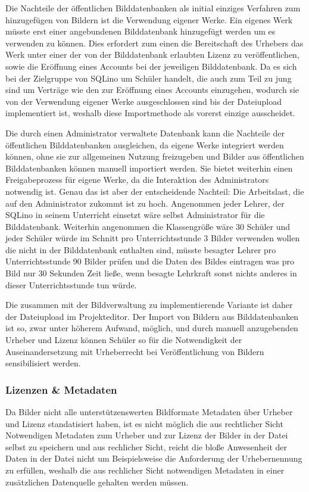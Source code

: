 Die Nachteile der öffentlichen Bilddatenbanken als initial einziges Verfahren
zum hinzugefügen von Bildern ist die Verwendung eigener Werke. Ein eigenes Werk
müsste erst einer angebundenen Bilddatenbank hinzugefügt werden um es verwenden
zu können. Dies erfordert zum einen die Bereitschaft des Urhebers das Werk unter
einer der von der Bilddatenbank erlaubten Lizenz zu veröffentlichen, sowie die
Eröffnung eines Accounts bei der jeweiligen Bilddatenbank. Da es sich bei der
Zielgruppe von SQLino um Schüler handelt, die auch zum Teil zu jung sind um
Verträge wie den zur Eröffnung eines Accounts einzugehen, wodurch sie von der
Verwendung eigener Werke ausgeschlossen sind bis der Dateiupload implementiert
ist, weshalb diese Importmethode als vorerst einzige ausscheidet.

Die durch einen Administrator verwaltete Datenbank kann die Nachteile der
öffentlichen Bilddatenbanken ausgleichen, da eigene Werke integriert werden
können, ohne sie zur allgemeinen Nutzung freizugeben und Bilder aus
öffentlichen Bilddatenbanken können manuell importiert werden. Sie bietet
weiterhin einen Freigabeprozess für eigene Werke, da die Interaktion des
Administrators notwendig ist. Genau das ist aber der entscheidende Nachteil: Die
Arbeitslast, die auf den Administrator zukommt ist zu hoch. Angenommen jeder
Lehrer, der SQLino in seinem Unterricht einsetzt wäre selbst Administrator für
die Bilddatenbank. Weiterhin angenommen die Klassengröße wäre 30 Schüler und
jeder Schüler würde im Schnitt pro Unterrichtsstunde 3 Bilder verwenden wollen
die nicht in der Bilddatenbank enthalten sind, müsste besagter Lehrer pro
Unterrichtsstunde 90 Bilder prüfen und die Daten des Bildes eintragen was pro
Bild nur 30 Sekunden Zeit ließe, wenn besagte Lehrkraft sonst nichts anderes in
dieser Unterrichtsstunde tun würde.

Die zusammen mit der Bildverwaltung zu implementierende Variante ist daher der
Dateiupload im Projekteditor. Der Import von Bildern aus Bilddatenbanken ist so,
zwar unter höherem Aufwand, möglich, und durch manuell anzugebenden Urheber und
Lizenz können Schüler so für die Notwendigkeit der Auseinandersetzung mit
Urheberrecht bei Veröffentlichung von Bildern sensibilisiert werden.

\subsubsection{Lizenzen \& Metadaten}

Da Bilder nicht alle unterstützenswerten Bildformate Metadaten über
Urheber und Lizenz standatisiert haben, ist es nicht möglich die aus
rechtlicher Sicht Notwendigen Metadaten zum Urheber und zur Lizenz der Bilder
in der Datei selbst zu speichern und aus rechlicher Sicht, reicht die bloße
Anwesenheit der Daten in der Datei nicht um Beispielsweise die Anforderung der
Urhebernennung zu erfüllen, weshalb die aus rechlicher Sicht notwendigen
Metadaten in einer zusätzlichen Datenquelle gehalten werden müssen.

